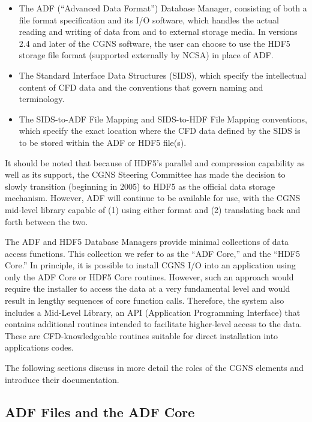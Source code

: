 \begin{itemize}
\item The ADF (``Advanced Data Format'') Database Manager, consisting
      of both a file format specification and its I/O software, which
      handles the actual reading and writing of data from and to
      external storage media.
      In versions 2.4 and later of the CGNS software, the user can
      choose to use the HDF5 storage file format (supported externally
      by NCSA) in place of ADF.
\item The Standard Interface Data Structures (SIDS), which specify the
      intellectual content of CFD data and the conventions that govern
      naming and terminology.
\item The SIDS-to-ADF File Mapping and SIDS-to-HDF File Mapping
      conventions, which specify the exact location where the CFD
      data defined by the SIDS is to be stored within the ADF or HDF5
      file(s).
\end{itemize}

It should be noted that because of HDF5's parallel and compression      
capability as well as its support, the CGNS Steering Committee has made 
the decision to slowly transition (beginning in 2005) to HDF5 as the    
official data storage mechanism.                                        
However, ADF will continue to be available for use, with the CGNS
mid-level library capable of (1) using either format and (2) translating
back and forth between the two.

The ADF and HDF5 Database Managers provide minimal collections of data
access functions.
This collection we refer to as the ``ADF Core,'' and the ``HDF5 Core.''
In principle, it is possible to install CGNS I/O into an application
using only the ADF Core or HDF5 Core routines.
However, such an approach would require the installer to access the data
at a very fundamental level and would result in lengthy sequences of
core function calls.
Therefore, the system also includes a Mid-Level Library, an API
(Application Programming Interface) that contains additional routines
intended to facilitate higher-level access to the data.
These are CFD-knowledgeable routines suitable for direct installation
into applications codes.

The following sections discuss in more detail the roles of the CGNS
elements and introduce their documentation.

\subsection{ADF Files and the ADF Core}


